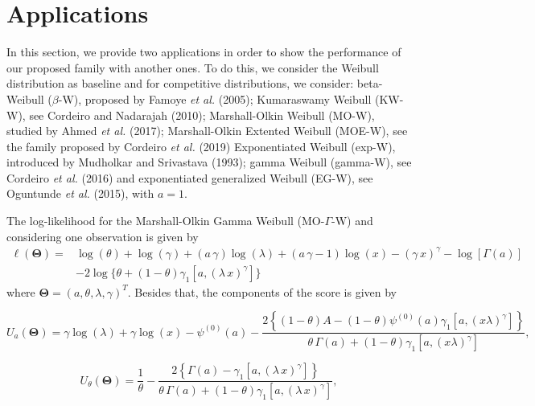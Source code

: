 \documentclass[12pt,a4paper]{article} %
\begin{document}
\section{Applications}\label{applications}

In this section, we provide two applications in order to show the performance of our proposed family with another ones. To do this, we consider the Weibull distribution as baseline and for competitive distributions, we consider: beta-Weibull ($\beta$-W), proposed by Famoye {\it et al.} (2005); Kumaraswamy Weibull (KW-W), see Cordeiro and Nadarajah (2010); Marshall-Olkin Weibull (MO-W), studied by Ahmed {\it et al.} (2017); Marshall-Olkin Extented Weibull (MOE-W), see the family proposed by Cordeiro {\it et al.} (2019)
Exponentiated Weibull (exp-W), introduced by Mudholkar and Srivastava (1993); gamma Weibull (gamma-W), see Cordeiro {\it et al.} (2016) and exponentiated generalized Weibull (EG-W), see Oguntunde {\it et al.} (2015), with $a=1$.

The log-likelihood for the Marshall-Olkin Gamma Weibull (MO-$\Gamma$-W) and considering one observation is given by
\begin{align}
\ell (\boldsymbol{\Theta})=& \log (\theta)+\log (\gamma)+(a\,\gamma)\log (\lambda)+(a\,\gamma-1)\log(x)-(\gamma\, x)^\gamma-\log[\Gamma(a)]\nonumber \\ &-2\log\{\theta+(1-\theta)\gamma_1[a,(\lambda\,x)^\gamma]\}
\end{align}
where $\boldsymbol{\Theta}=(a,\theta,\lambda,\gamma)^T$. Besides that, the components of the score is given by

\begin{equation*}
U_{a}(\boldsymbol{\Theta})=\gamma  \log (\lambda )+\gamma  \log (x)-\psi ^{(0)}(a)-\frac{2\left\{(1-\theta ) A-(1-\theta ) \psi ^{(0)}(a) \gamma_1 \left[a,(x \lambda
   )^{\gamma }\right]\right\}}{\theta\,\Gamma(a)+(1-\theta)\gamma_1\left[a,(x \lambda
   )^{\gamma }\right]},
\end{equation*}

\begin{equation*}
U_{\theta}(\boldsymbol{\Theta})=\frac{1}{\theta}-\frac{2\left\{\Gamma(a)-\gamma_1\left[a,(\lambda\,x)^\gamma\right]\right\}}{\theta\,\Gamma(a)+(1-\theta)\gamma_1\left[a,(\lambda\,x)^\gamma\right]},
\end{equation*}
\end{document}
